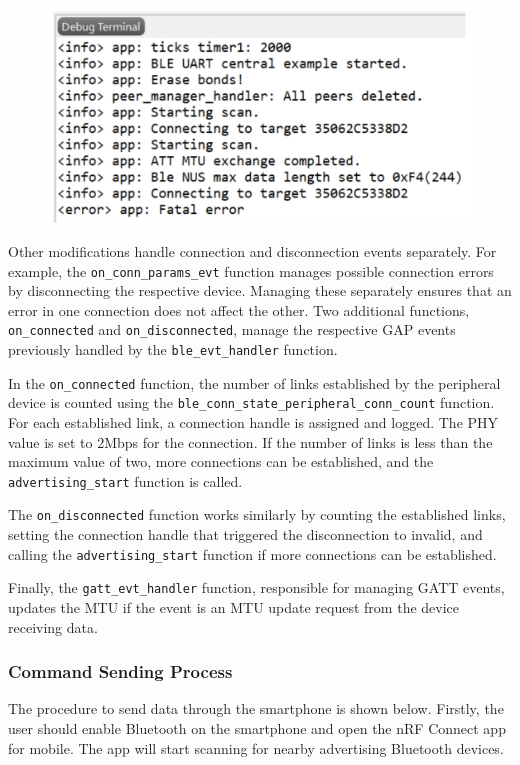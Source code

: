 \documentclass{Configuration_Files/PoliMi3i_thesis}
\begin{document}
\begin{figure}[H]
    \centering
    \includegraphics[scale=0.3]{Multicentral/5.png}
    \label{fig:faulty_error_state_central_board}
\end{figure}

Other modifications handle connection and disconnection events separately. For example, the \texttt{on\_conn\_params\_evt} function manages possible connection errors by disconnecting the respective device. Managing these separately ensures that an error in one connection does not affect the other. Two additional functions, \texttt{on\_connected} and \texttt{on\_disconnected}, manage the respective GAP events previously handled by the \texttt{ble\_evt\_handler} function.

In the \texttt{on\_connected} function, the number of links established by the peripheral device is counted using the \texttt{ble\_conn\_state\_peripheral\_conn\_count} function. For each established link, a connection handle is assigned and logged. The PHY value is set to 2Mbps for the connection. If the number of links is less than the maximum value of two, more connections can be established, and the \texttt{advertising\_start} function is called.

The \texttt{on\_disconnected} function works similarly by counting the established links, setting the connection handle that triggered the disconnection to invalid, and calling the \texttt{advertising\_start} function if more connections can be established.

Finally, the \texttt{gatt\_evt\_handler} function, responsible for managing GATT events, updates the MTU if the event is an MTU update request from the device receiving data.

\subsubsection{Command Sending Process}
The procedure to send data through the smartphone is shown below. Firstly, the user should enable Bluetooth on the smartphone and open the nRF Connect app for mobile. The app will start scanning for nearby advertising Bluetooth devices.
\end{document}
